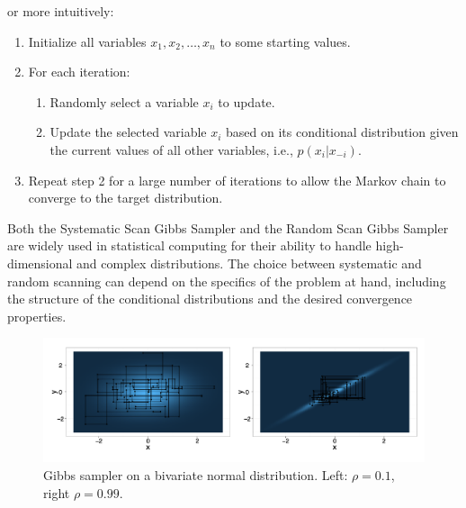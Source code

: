 \documentclass[10pt]{article}
\begin{document}
or more intuitively:
\begin{enumerate}
    \item Initialize all variables \(x_1, x_2, \ldots, x_n\) to some starting values.
    \item For each iteration:
    \begin{enumerate}
        \item Randomly select a variable \(x_i\) to update.
        \item Update the selected variable \(x_i\) based on its conditional distribution given the current values of all other variables, i.e., \(p(x_i | x_{-i})\).
    \end{enumerate}
    \item Repeat step 2 for a large number of iterations to allow the Markov chain to converge to the target distribution.
\end{enumerate}
Both the Systematic Scan Gibbs Sampler and the Random Scan Gibbs Sampler are widely used in statistical computing for their ability to handle high-dimensional and complex distributions. The choice between systematic and random scanning can depend on the specifics of the problem at hand, including the structure of the conditional distributions and the desired convergence properties.


\begin{figure}
    \centering
    \includegraphics[width=1\linewidth]{overviews/MCMC/figures/slow-fast-mixing.png}
    \caption{Gibbs sampler on a bivariate normal distribution. Left: $\rho=0.1$, right $\rho=0.99$.}
    \label{fig:}
\end{figure}
\end{document}
